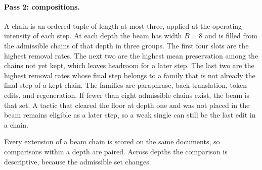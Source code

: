 \paragraph{Pass 2: compositions.}
A chain is an ordered tuple of length at most three, applied at the operating intensity of each step. At each depth the beam has width $B = 8$ and is filled from the admissible chains of that depth in three groups. The first four slots are the highest removal rates. The next two are the highest mean preservation among the chains not yet kept, which leaves headroom for a later step. The last two are the highest removal rates whose final step belongs to a family that is not already the final step of a kept chain. The families are paraphrase, back-translation, token edits, and regeneration. If fewer than eight admissible chains exist, the beam is that set. A tactic that cleared the floor at depth one and was not placed in the beam remains eligible as a later step, so a weak single can still be the last edit in a chain.

Every extension of a beam chain is scored on the same documents, so comparisons within a depth are paired. Across depths the comparison is descriptive, because the admissible set changes.

